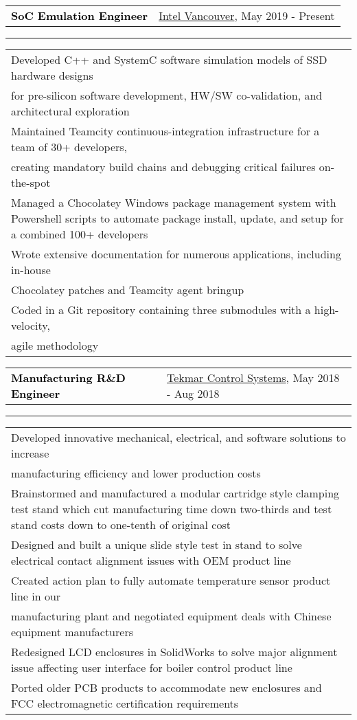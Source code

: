 \documentclass[10pt,letterpaper]{article}
\newcommand{\mpwidth}{\linewidth-\fboxsep-\fboxsep}
\newcommand{\tzlarrow}{(0,0) -- (0.2,0) -- (0.3,0.2) -- (0.2,0.4) -- (0,0.4) -- (0.1,0.2) -- cycle;}
\newcommand{\larrow}[1]
{\begin{tikzpicture}[scale=0.58]
	 \filldraw[fill=#1!100,draw=#1!100!black]  \tzlarrow
 \end{tikzpicture}
}
\newcommand{\cvbigevent}[9]
{
\vspace{8pt}
	\begin{tabular*}{0.2\mpwidth}{p{0.4\mpwidth}  x{0.575\mpwidth}}
 	\textcolor{black}{\textbf{#2}} & \textcolor{complcol}{#3}, \textcolor{bgcol}{#1} 

	\end{tabular*}
\vspace{-12pt}
\textcolor{softcol}{\hrule}
\vspace{6pt}
	\begin{tabular*}{0.5\mpwidth}{p{\mpwidth}}
\larrow{softcol}  #4\\[6pt]
\larrow{softcol}  #5\\[6pt]
\larrow{softcol}  #6\\[6pt]
\larrow{softcol}  #7\\[6pt]
\larrow{softcol}  #8\\[6pt]
\larrow{softcol}  #9\\[6pt]
	\end{tabular*}

}
\newcommand{\cvIntelEvent}[8]
{
\vspace{8pt}
	\begin{tabular*}{0.2\mpwidth}{p{0.4\mpwidth}  x{0.575\mpwidth}}
 	\textcolor{black}{\textbf{#2}} & \textcolor{complcol}{#3}, \textcolor{bgcol}{#1} 

	\end{tabular*}
\vspace{-12pt}
\textcolor{softcol}{\hrule}
\vspace{6pt}
	\begin{tabular*}{0.5\mpwidth}{p{\mpwidth}}
\larrow{softcol}  #4\\[6pt]
\larrow{softcol}  #5\\[6pt]
\larrow{softcol}  #6\\[6pt]
\larrow{softcol}  #7\\[6pt]
\larrow{softcol}  #8\\[6pt]
	\end{tabular*}

}
\begin{document}
{\begin{minipage}[c][0.95\textheight][t]{0.69\linewidth}
\cvIntelEvent{May 2019 - Present}{SoC Emulation Engineer}{\href{http://www.intel.com}{Intel Vancouver}}{Developed C++ and SystemC software simulation models of SSD hardware designs \\for pre-silicon software development, HW/SW co-validation,
and architectural exploration}{Maintained Teamcity continuous-integration infrastructure for a team of 30+ developers, \\creating mandatory build chains and debugging critical failures on-the-spot}{Managed a Chocolatey Windows package management system with Powershell scripts to automate package install, update, and setup for a combined 100+ developers}{Wrote extensive documentation for numerous applications, including in-house \\Chocolatey patches and Teamcity agent bringup}{Coded in a Git repository containing three submodules with a high-velocity,\\agile methodology}
\cvbigevent{May 2018 - Aug 2018}{Manufacturing R\&D Engineer}{\href{http://www.tekmarcontrols.com/}{Tekmar Control Systems}}{Developed innovative mechanical, electrical, and software solutions to increase \\ manufacturing efficiency and lower production costs}{Brainstormed and manufactured a modular cartridge style clamping test stand which cut manufacturing time down two-thirds and test stand costs down to one-tenth of original cost}{Designed and built a unique slide style test in stand to solve electrical contact alignment issues with OEM product line}{Created action plan to fully automate temperature sensor product line in our \\manufacturing plant and negotiated equipment deals with Chinese equipment manufacturers}{Redesigned LCD enclosures in SolidWorks to solve major alignment issue affecting user interface for boiler control product line}{Ported older PCB products to accommodate new enclosures and FCC electromagnetic certification requirements}






\end{minipage}}
\end{document}
